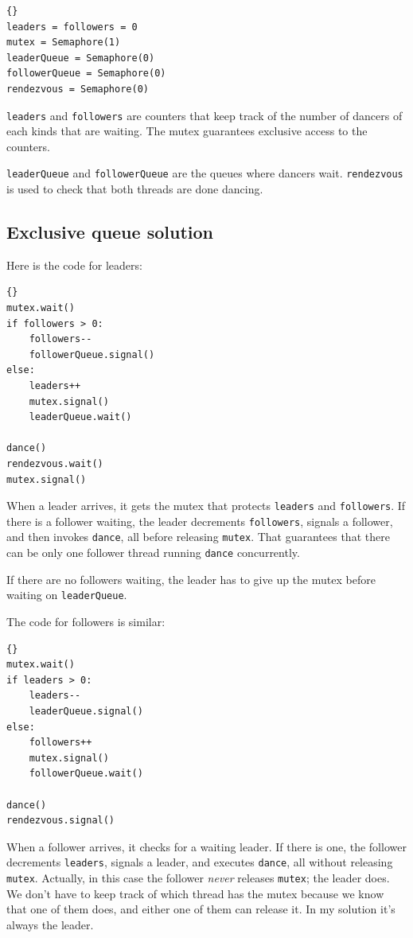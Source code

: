 \documentclass{book}
\newcommand{\clearemptydoublepage}{\newpage\cleardoublepage}
\begin{document}
\begin{lstlisting}[caption={Queue hint}]{}
leaders = followers = 0
mutex = Semaphore(1)
leaderQueue = Semaphore(0)
followerQueue = Semaphore(0)
rendezvous = Semaphore(0)
\end{lstlisting}

{\tt leaders} and {\tt followers} are counters that
keep track of the number of dancers of each kinds that are
waiting.  The mutex guarantees exclusive access to the counters.

{\tt leaderQueue} and {\tt followerQueue} are the queues where
dancers wait.  {\tt rendezvous} is used to check that both threads
are done dancing.



\clearemptydoublepage
\subsection {Exclusive queue solution}

Here is the code for leaders:

\begin{lstlisting}[caption={Queue solution (leaders)}]{}
mutex.wait()
if followers > 0:
    followers--
    followerQueue.signal()
else:
    leaders++
    mutex.signal()
    leaderQueue.wait()    

dance()
rendezvous.wait()
mutex.signal()
\end{lstlisting}

When a leader arrives, it gets the mutex that protects {\tt leaders}
and {\tt followers}.  If there is a follower waiting, the leader
decrements {\tt followers}, signals a follower, and then invokes
{\tt dance}, all before releasing {\tt mutex}.  That guarantees that
there can be only one follower thread running {\tt dance}
concurrently.

If there are no followers waiting, the leader has to give up the mutex
before waiting on {\tt leaderQueue}.

The code for followers is similar:

\begin{lstlisting}[caption={Queue solution (followers)}]{}
mutex.wait()
if leaders > 0:
    leaders--
    leaderQueue.signal()
else:
    followers++
    mutex.signal()
    followerQueue.wait()    

dance()
rendezvous.signal()
\end{lstlisting}

When a follower arrives, it checks for a waiting leader.  If there
is one, the follower decrements {\tt leaders}, signals a leader, and
executes {\tt dance}, all without releasing {\tt mutex}.  Actually,
in this case the follower {\em never} releases {\tt mutex};
the leader does.  We don't have to keep track of which thread has the
mutex because we know that one of them does, and either one of them can
release it.  In my solution it's always the leader.
\end{document}
